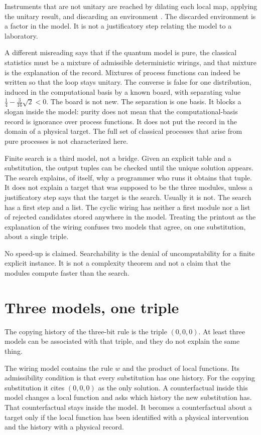\documentclass[12pt]{article}
\begin{document}
Instruments that are not unitary are reached by dilating each local map, applying the unitary result, and discarding an environment \citep{stinespring1955,oreshkov2012}. The discarded environment is a factor in the model. It is not a justificatory step relating the model to a laboratory.

A different misreading says that if the quantum model is pure, the classical statistics must be a mixture of admissible deterministic wirings, and that mixture is the explanation of the record. Mixtures of process functions can indeed be written so that the loop stays unitary. The converse is false for one distribution, induced in the computational basis by a known board, with separating value \(\tfrac14-\tfrac{3}{16}\sqrt{2}<0\). The board is not new. The separation is one basis. It blocks a slogan inside the model: purity does not mean that the computational-basis record is ignorance over process functions. It does not put the record in the domain of a physical target. The full set of classical processes that arise from pure processes is not characterized here.

Finite search is a third model, not a bridge. Given an explicit table and a substitution, the output tuples can be checked until the unique solution appears. The search explains, of itself, why a programmer who runs it obtains that tuple. It does not explain a target that was supposed to be the three modules, unless a justificatory step says that the target is the search. Usually it is not. The search has a first step and a list. The cyclic wiring has neither a first module nor a list of rejected candidates stored anywhere in the model. Treating the printout as the explanation of the wiring confuses two models that agree, on one substitution, about a single triple.

No speed-up is claimed. Searchability is the denial of uncomputability for a finite explicit instance. It is not a complexity theorem and not a claim that the modules compute faster than the search.

\section{Three models, one triple}
\label{sec:three}

The copying history of the three-bit rule is the triple \((0,0,0)\). At least three models can be associated with that triple, and they do not explain the same thing.

The wiring model contains the rule \(w\) and the product of local functions. Its admissibility condition is that every substitution has one history. For the copying substitution it cites \((0,0,0)\) as the only solution. A counterfactual inside this model changes a local function and asks which history the new substitution has. That counterfactual stays inside the model. It becomes a counterfactual about a target only if the local function has been identified with a physical intervention and the history with a physical record.
\end{document}
